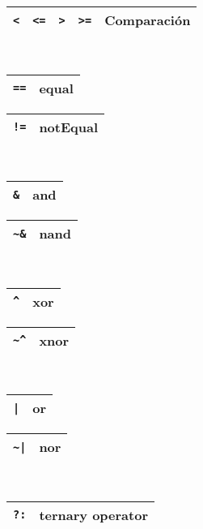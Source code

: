 \documentclass[aspectratio=169]{beamer}
\begin{document}
\begin{frame}[fragile,t]
\begin{textblock}{80}
\begin{center}
    \begin{tabular}{|C{0.35cm}|C{0.35cm}|C{0.35cm}|C{0.34cm}|C{2.05cm}|} \hline \verb|<| & \verb|<=| & \verb|>| & \verb|>=| & 
    Comparación  \\ \hline \end{tabular}\\
    \begin{tabular}{|C{0.6cm}|C{1.3cm}|}   \hline \verb|==| & equal  \\ \hline \end{tabular}
    \begin{tabular}{|C{0.6cm}|C{1.3cm}|} \hline \verb|!=| & notEqual  \\ \hline \end{tabular}\\
    \begin{tabular}{|C{0.6cm}|C{1.3cm}|}   \hline \verb|&| & and  \\ \hline \end{tabular}
    \begin{tabular}{|C{0.6cm}|C{1.3cm}|} \hline \verb|~&| & nand  \\ \hline \end{tabular}\\
    \begin{tabular}{|C{0.6cm}|C{1.3cm}|}   \hline \verb|^| & xor  \\ \hline \end{tabular}
    \begin{tabular}{|C{0.6cm}|C{1.3cm}|} \hline \verb|~^| & xnor  \\ \hline \end{tabular}\\
    \begin{tabular}{|C{0.6cm}|C{1.3cm}|}   \hline \verb:|: & or  \\ \hline \end{tabular}
    \begin{tabular}{|C{0.6cm}|C{1.3cm}|} \hline \verb:~|: & nor  \\ \hline \end{tabular}\\
    \begin{tabular}{|C{0.6cm}|C{4.15cm}|} \hline \verb|?:| & ternary operator  \\ \hline \end{tabular}\\

\end{center}
\end{textblock}
\end{frame}
\end{document}
